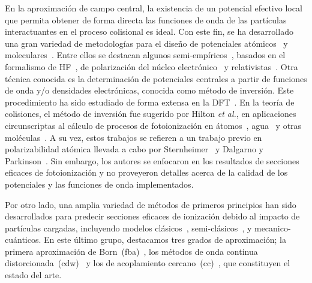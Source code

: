 En la aproximación de campo central, la existencia de un potencial 
efectivo local que permita obtener de forma directa las funciones de 
onda de las partículas interactuantes en el proceso colisional es ideal.
Con este fin, se ha desarrollado una gran variedad de metodologías para 
el diseño de potenciales atómicos~\cite{Hibbert:82} y 
moleculares~\cite{Granados:15}. Entre ellos se destacan algunos 
semi-empíricos~\cite{falta}, basados en el formalismo de 
HF~\cite{falta}, de polarización del núcleo electrónico~\cite{falta} y 
relativistas~\cite{falta}. Otra técnica conocida es la determinación de 
potenciales centrales a partir de funciones de onda y/o densidades 
electrónicas, conocida como método de inversión. Este procedimiento ha 
sido estudiado de forma extensa en la DFT~\cite{Wu:03,Gaiduk:13,
Ryabinkin:15,Schipper:97,deSilva:12,Kananenka:13,Mura:97,Jacob:11}. 
En la teoría de colisiones, el método de inversión fue sugerido por 
Hilton \textit{et al.}, en aplicaciones circunscriptas al cálculo de 
procesos de fotoionización en átomos~\cite{Hilton:77,Suzer:77}, 
agua~\cite{Hilton:79} y otras moléculas~\cite{Hilton:80,Crljen:87}. A su 
vez, estos trabajos se refieren a un trabajo previo en polarizabilidad 
atómica llevada a cabo por Sternheimer~\cite{Sternheimer:54} y Dalgarno 
y Parkinson~\cite{Dalgarno:59}. Sin embargo, los autores se enfocaron en 
los resultados de secciones eficaces de fotoionización y no proveyeron 
detalles acerca de la calidad de los potenciales y las funciones de 
onda implementados.

Por otro lado, una amplia variedad de métodos de primeros principios han 
sido desarrollados para predecir secciones eficaces de ionización debido 
al impacto de partículas cargadas, incluyendo modelos 
clásicos~\cite{falta}, semi-clásicos~\cite{falta}, y mecanico-cuánticos. 
En este último grupo, destacamos tres grados de aproximación; la primera 
aproximación de Born~(\acs{fba})~\cite{Bates:62,McDowell:61}, los 
métodos de onda continua distorcionada~(\acs{cdw})~\cite{Crothers:10,
Rivarola:87} y los de acoplamiento cercano~(\acs{cc})~\cite{Burke:11,
Pindzola:07,Bray:17}, que constituyen el estado del arte.

